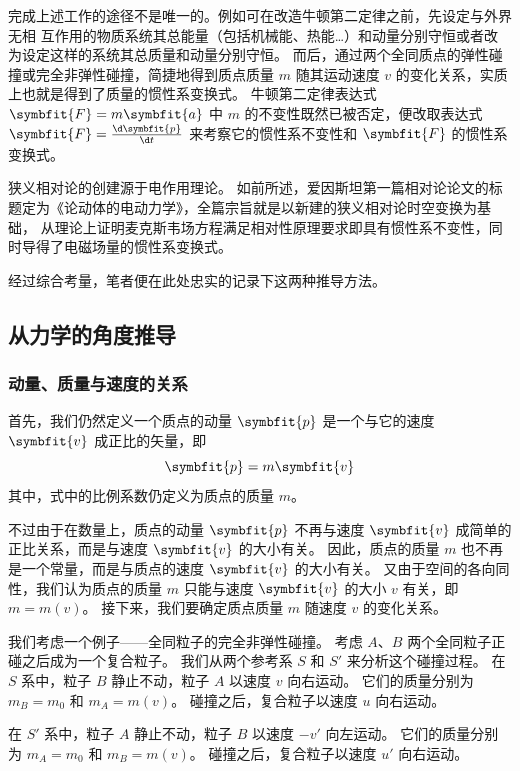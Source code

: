 完成上述工作的途径不是唯一的。例如可在改造牛顿第二定律之前，先设定与外界无相
互作用的物质系统其总能量（包括机械能、热能\ldots）和动量分别守恒或者改为设定这样的系统其总质量和动量分别守恒。
而后，通过两个全同质点的弹性碰撞或完全非弹性碰撞，简捷地得到质点质量 $m$ 随其运动速度 $v$ 的变化关系，实质上也就是得到了质量的惯性系变换式。
牛顿第二定律表达式 $ \symbfit{F} = m \symbfit{a} $ 中 $m$ 的不变性既然已被否定，便改取表达式 $\symbfit{F} = \frac{\d \symbfit{p}}{\d t}$ 来考察它的惯性系不变性和 $\symbfit{F}$ 的惯性系变换式。

狭义相对论的创建源于电作用理论。
如前所述，爱因斯坦第一篇相对论论文的标题定为《论动体的电动力学》，全篇宗旨就是以新建的狭义相对论时空变换为基础，
从理论上证明麦克斯韦场方程满足相对性原理要求即具有惯性系不变性，同时导得了电磁场量的惯性系变换式。

经过综合考量，笔者便在此处忠实的记录下这两种推导方法。

\subsection{从力学的角度推导\texorpdfstring{\cite{zhaokaihua2004}}{}}

\subsubsection{动量、质量与速度的关系}

首先，我们仍然定义一个质点的动量 $\symbfit{p}$ 是一个与它的速度 $\symbfit{v}$ 成正比的矢量，即
\begin{equation}
    \symbfit{p} = m \symbfit{v}
\end{equation}
其中，式中的比例系数仍定义为质点的质量 $m$。

不过由于在数量上，质点的动量 $\symbfit{p}$ 不再与速度 $\symbfit{v}$ 成简单的正比关系，而是与速度 $\symbfit{v}$ 的大小有关。
因此，质点的质量 $m$ 也不再是一个常量，而是与质点的速度 $\symbfit{v}$ 的大小有关。
又由于空间的各向同性，我们认为质点的质量 $m$ 只能与速度 $\symbfit{v}$ 的大小 $v$ 有关，即 $m = m(v)$。
接下来，我们要确定质点质量 $m$ 随速度 $v$ 的变化关系。

我们考虑一个例子——全同粒子的完全非弹性碰撞。
考虑 $A$、$B$ 两个全同粒子正碰之后成为一个复合粒子。
我们从两个参考系 $S$ 和 $S'$ 来分析这个碰撞过程。
在 $S$ 系中，粒子 $B$ 静止不动，粒子 $A$ 以速度 $v$ 向右运动。
它们的质量分别为 $m_B = m_0$ 和 $m_A = m(v)$。
碰撞之后，复合粒子以速度 $u$ 向右运动。

在 $S'$ 系中，粒子 $A$ 静止不动，粒子 $B$ 以速度 $-v'$ 向左运动。
它们的质量分别为 $m_A = m_0$ 和 $m_B = m(v)$。
碰撞之后，复合粒子以速度 $u'$ 向右运动。

